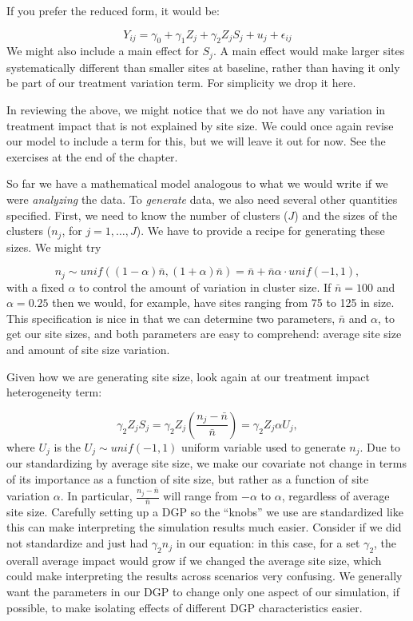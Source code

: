 \documentclass[
]{book}
\begin{document}
If you prefer the reduced form, it would be:

\[ Y_{ij} = \gamma_{0} + \gamma_{1} Z_j + \gamma_2 Z_j S_j  + u_j + \epsilon_{ij}  \]
We might also include a main effect for \(S_j\).
A main effect would make larger sites systematically different than smaller sites at baseline, rather than having it only be part of our treatment variation term.
For simplicity we drop it here.

In reviewing the above, we might notice that we do not have any variation in treatment impact that is not explained by site size.
We could once again revise our model to include a term for this, but we will leave it out for now.
See the exercises at the end of the chapter.

So far we have a mathematical model analogous to what we would write if we were \emph{analyzing} the data.
To \emph{generate} data, we also need several other quantities specified.
First, we need to know the number of clusters (\(J\)) and the sizes of the clusters (\(n_j\), for \(j = 1, \ldots, J\)).
We have to provide a recipe for generating these sizes.
We might try

\[ n_j \sim unif( (1-\alpha)\bar{n}, (1+\alpha)\bar{n} ) = \bar{n} + \bar{n}\alpha \cdot unif(-1, 1) ,\]
with a fixed \(\alpha\) to control the amount of variation in cluster size.
If \(\bar{n} = 100\) and \(\alpha = 0.25\) then we would, for example, have sites ranging from 75 to 125 in size.
This specification is nice in that we can determine two parameters, \(\bar{n}\) and \(\alpha\), to get our site sizes, and both parameters are easy to comprehend: average site size and amount of site size variation.

Given how we are generating site size, look again at our treatment impact heterogeneity term:

\[ \gamma_2 Z_j S_j = \gamma_2 Z_j \left(\frac{n_j - \bar{n}}{\bar{n}}\right) = \gamma_2 Z_j \alpha U_j, \]
where \(U_j\) is the \(U_j \sim unif(-1,1)\) uniform variable used to generate \(n_j\).
Due to our standardizing by average site size, we make our covariate not change in terms of its importance as a function of site size, but rather as a function of site variation \(\alpha\).
In particular, \(\frac{n_j - \bar{n}}{\bar{n}}\) will range from \(-\alpha\) to \(\alpha\), regardless of average site size.
Carefully setting up a DGP so the ``knobs'' we use are standardized like this can make interpreting the simulation results much easier.
Consider if we did not standardize and just had \(\gamma_2 n_j\) in our equation: in this case, for a set \(\gamma_2\), the overall average impact would grow if we changed the average site size, which could make interpreting the results across scenarios very confusing.
We generally want the parameters in our DGP to change only one aspect of our simulation, if possible, to make isolating effects of different DGP characteristics easier.
\end{document}
